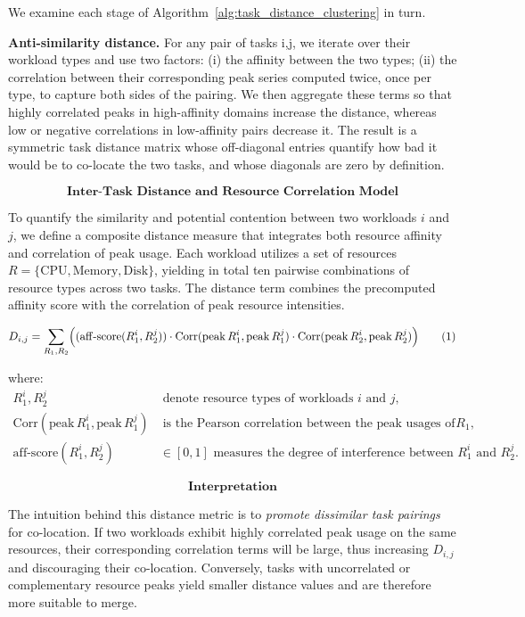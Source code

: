 We examine each stage of Algorithm~\ref{alg:task_distance_clustering} in turn.

\textbf{Anti-similarity distance.} For any pair of tasks i,j, we iterate over their workload types and use two factors: (i) the affinity between the two types; (ii) the correlation between their corresponding peak series computed twice, once per type, to capture both sides of the pairing. We then aggregate these terms so that highly correlated peaks in high-affinity domains increase the distance, whereas low or negative correlations in low-affinity pairs decrease it. The result is a symmetric task distance matrix whose off-diagonal entries quantify how bad it would be to co-locate the two tasks, and whose diagonals are zero by definition.

\[
    \textbf{Inter-Task Distance and Resource Correlation Model}
\]

To quantify the similarity and potential contention between two workloads
\( i \) and \( j \), we define a composite distance measure
that integrates both resource affinity and correlation of peak usage.
Each workload utilizes a set of resources
\( R = \{ \text{CPU}, \text{Memory}, \text{Disk}\} \),
yielding in total ten pairwise combinations of resource types across two tasks.
The distance term combines the precomputed affinity score with the
correlation of peak resource intensities.

\[
    D_{i,j}
    = \sum_{R_1, R_2}
    \Bigl(
    (\mathrm{aff\text{-}score}(R_1^i, R_2^j))
    \cdot
    \mathrm{Corr}(\mathrm{peak}\,R_1^i, \mathrm{peak}\,R_1^j)
    \cdot
    \mathrm{Corr}(\mathrm{peak}\,R_2^i, \mathrm{peak}\,R_2^j)
    \Bigr)
    \tag{1}
\]

where:
\begin{align}
    R_1^i, R_2^j & \; \text{denote resource types of workloads } i \text{ and } j,                           \\[4pt]
    \mathrm{Corr}(\mathrm{peak}\,R_1^i, \mathrm{peak}\,R_1^j)
                 & \; \text{is the Pearson correlation between the peak usages of resource } R_1,            \\[4pt]
    \mathrm{aff\text{-}score}(R_1^i, R_2^j)
                 & \in [0, 1] \text{ measures the degree of interference between } R_1^i \text{ and } R_2^j.
\end{align}

\[
    \textbf{Interpretation}
\]

The intuition behind this distance metric is to
\emph{promote dissimilar task pairings} for co-location.
If two workloads exhibit highly correlated peak usage on the same resources,
their corresponding correlation terms will be large,
thus increasing \( D_{i,j} \) and discouraging their co-location.
Conversely, tasks with uncorrelated or complementary resource peaks
yield smaller distance values and are therefore more suitable to merge.

